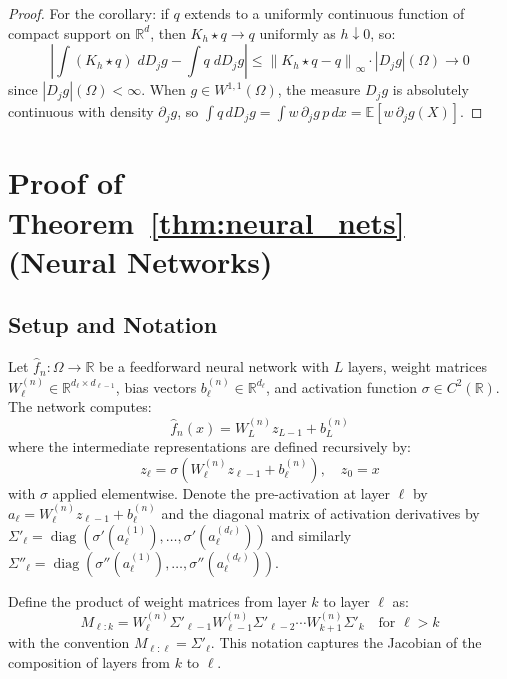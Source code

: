 \documentclass[12pt]{article}
\newcommand{\norm}[1]{\left\| #1 \right\|}
\newcommand{\R}{\mathbb{R}}
\newcommand{\E}{\mathbb{E}}
\newcommand{\fn}{\hat{f}_n}
\newcommand{\abs}[1]{\left| #1 \right|}
\begin{document}
\begin{proof}
		For the corollary: if $q$ extends to a uniformly continuous function of
		compact support on $\R^d$, then $K_h \star q \to q$ uniformly as
		$h \downarrow 0$, so:
		\begin{equation}
			\abs{\int (K_h \star q)\; d D_j g - \int q\; d D_j g}
			\leq \norm{K_h \star q - q}_\infty \cdot \abs{D_j g}(\Omega) \to 0
		\end{equation}
		since $\abs{D_j g}(\Omega) < \infty$. When $g \in W^{1,1}(\Omega)$, the
		measure $D_j g$ is absolutely continuous with density $\partial_j g$, so
		$\int q\, d D_j g = \int w\, \partial_j g\, p\, dx
		= \E[w\, \partial_j g(X)]$.
	\end{proof}
	
	\section{Proof of Theorem~\ref{thm:neural_nets} (Neural Networks)}
	\label{app:neural_nets}
	
	\subsection{Setup and Notation}
	
	Let $\fn: \Omega \to \R$ be a feedforward neural network with $L$ layers,
	weight matrices $W_\ell^{(n)} \in \R^{d_\ell \times d_{\ell-1}}$, bias vectors
	$b_\ell^{(n)} \in \R^{d_\ell}$, and activation function $\sigma \in C^2(\R)$.
	The network computes:
	\begin{equation}
		\fn(x) = W_L^{(n)} z_{L-1} + b_L^{(n)}
	\end{equation}
	where the intermediate representations are defined recursively by:
	\begin{equation}
		z_\ell = \sigma\!\left(W_\ell^{(n)} z_{\ell-1} + b_\ell^{(n)}\right),
		\quad z_0 = x
	\end{equation}
	with $\sigma$ applied elementwise. Denote the pre-activation at layer $\ell$
	by $a_\ell = W_\ell^{(n)} z_{\ell-1} + b_\ell^{(n)}$ and the diagonal
	matrix of activation derivatives by $\Sigma'_\ell = \operatorname{diag}
	(\sigma'(a_\ell^{(1)}), \ldots, \sigma'(a_\ell^{(d_\ell)}))$ and similarly
	$\Sigma''_\ell = \operatorname{diag}(\sigma''(a_\ell^{(1)}), \ldots,
	\sigma''(a_\ell^{(d_\ell)}))$.
	
	Define the product of weight matrices from layer $k$ to layer $\ell$ as:
	\begin{equation}
		M_{\ell:k} = W_\ell^{(n)} \Sigma'_{\ell-1} W_{\ell-1}^{(n)}
		\Sigma'_{\ell-2} \cdots W_{k+1}^{(n)} \Sigma'_k
		\quad \text{for } \ell > k
	\end{equation}
	with the convention $M_{\ell:\ell} = \Sigma'_\ell$. This notation captures
	the Jacobian of the composition of layers from $k$ to $\ell$.
	
\end{document}
